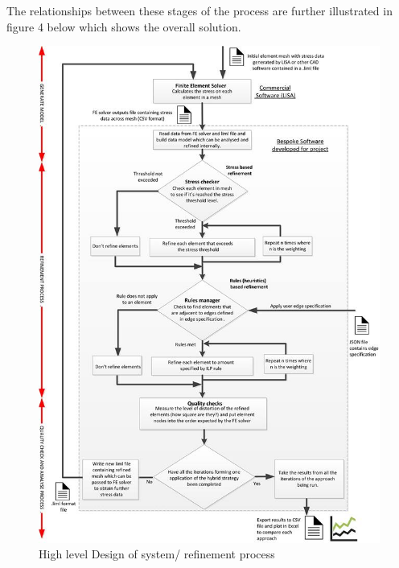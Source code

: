 \noindent
The relationships between these stages of the process are further illustrated in figure 4 below which shows the overall solution.


\begin{figure}[H]
  \centerline{\includegraphics[width=150mm, scale=1]{../Graphics/ProcessDiagram}}
  \caption{High level Design of system/ refinement process}
  \label{fig:h-refinementImp}
\end{figure}







